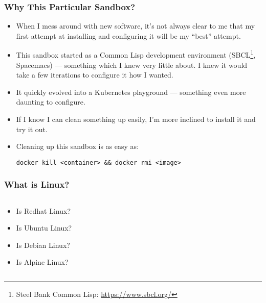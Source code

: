     \begin{frame}[fragile]
      \frametitle{Why This Particular Sandbox?}
      \begin{itemize}
      \item<2->
        {
          When I mess around with new software, it's not always clear to me that
          my first attempt at installing and configuring it will be my ``best''
          attempt.
        }
      \item<3->
        {
          This sandbox started as a Common Lisp development environment
          (SBCL\footnote<3->{Steel Bank Common Lisp: \href{https://www.sbcl.org/}{https://www.sbcl.org/}}, Spacemacs) --- something which I knew very little about. I knew
          it would take a few iterations to configure it how I wanted.
        }
      \item<4->
        {
          It quickly evolved into a Kubernetes playground --- something
          even more daunting to configure.
        }
      \item<5->
        {
          If I know I can clean something up easily, I'm more inclined to
          install it and try it out.
        }
      \item<6->Cleaning up this sandbox is as easy as:\\
\begin{verbatim}
docker kill <container> && docker rmi <image>
\end{verbatim}
      \end{itemize}
    \end{frame}

    \begin{frame}
    \frametitle{What is Linux?}
    \begin{columns}
        \begin{column}{0.5\textwidth}
            \begin{itemize}
                \item<2->Is Redhat Linux?
                \item<3->Is Ubuntu Linux?
                \item<4->Is Debian Linux?
                \item<5->Is Alpine Linux?
            \end{itemize}
        \end{column}
        \begin{column}{0.5\textwidth}
          \begin{center}
          \end{center}
        \end{column}
    \end{columns}
    \end{frame}

